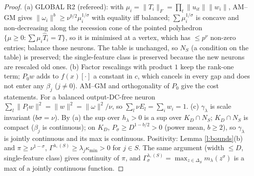 \documentclass[11pt]{article}
\theoremstyle{remark}\newtheorem{remark}[theorem]{Remark}
\begin{document}
\begin{proof}
(a) GLOBAL R2 (refereed): with $\mu_i=\|T_i\|_F=\prod_t\|u_{it}\|\|w_i\|$, AM--GM gives $\|\omega_i\|^b\ge\nu^{b/2}\mu_i^{1/\sigma}$
with equality iff balanced; $\sum\mu_i^{1/\sigma}$ is concave and non-decreasing along the recession cone of the pointed
polyhedron $\{\mu\ge0:\sum\mu_i\hat T_i=T\}$, so it is minimised at a vertex, which has $\le p^\nu$ non-zero entries;
balance those neurons. The table is unchanged, so $N_S$ (a condition on the table) is preserved; the single-feature
class is preserved because the new neurons are rescaled old ones.
(b) Factor rescalings with product $1$ keep the rank-one term; $P_0w$ adds to $f(x)[\cdot]$ a constant in $c$, which
cancels in every gap and does not enter any $\beta_j$ ($j\ne0$). AM--GM and orthogonality of $P_0$ give the cost
statements. For a balanced output-DC-free neuron $\sum_l\|P_lw\|^2=\|w\|^2=\|\omega\|^2/\nu$, so $\sum_l\nu E_l=\sum_iw_i=1$.
(c) $\gamma_\lambda$ is scale invariant ($b\sigma=\nu$). By (a) the sup over $h_\lambda>0$ is a sup over $K_D\cap N_S$;
$K_D\cap N_S$ is compact ($\beta_j$ is continuous); on $K_D$, $P_\sigma\ge D^{1-b/2}>0$ (power mean, $b\ge2$), so
$\gamma_\lambda$ is jointly continuous and its max is continuous. Positivity: Lemma \ref{l:bounds}(b) and $\pi\ge\nu^{1-\sigma}$,
$\Gamma^{\lambda,(S)}\ge\lambda_j\kappa_{\min}>0$ for $j\in S$. The same argument (width $\le D$, single-feature class) gives
continuity of $\pi$, and $\Gamma^{\lambda,(S)}_\sigma=\max_{z\in\Delta_S}m_\lambda(z^\sigma)$ is a max of a jointly continuous function.
\end{proof}
\end{document}
